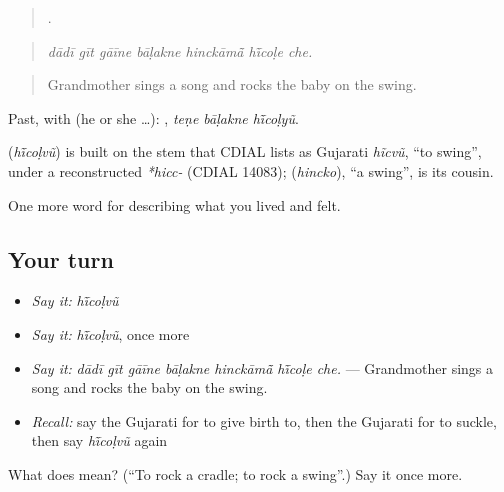 \begin{quote}
      .
\end{quote}

\begin{quote}
\emph{dādī gīt gāīne bāḷakne hinckāmā̃ hī̃coḷe che.}
\end{quote}

\begin{quote}
Grandmother sings a song and rocks the baby on the swing.
\end{quote}

Past, with  (he or she …):   , \emph{teṇe bāḷakne hī̃coḷyũ}.

\begin{cousinweb}
\textbf{} (\emph{hī̃coḷvũ}) is built on the stem that CDIAL lists as Gujarati \emph{hĩcvũ}, \textquotedblleft{}to swing\textquotedblright{}, under a reconstructed \emph{*hicc-} (CDIAL 14083); \textbf{} (\emph{hincko}), \textquotedblleft{}a swing\textquotedblright{}, is its cousin.
\end{cousinweb}

\begin{grammarlens}[title={What you've built}]
One more word for describing what you lived and felt.
\end{grammarlens}

\subsection*{Your turn}
\begin{itemize}
\raggedright
  \item \emph{Say it:} \emph{hī̃coḷvũ}
  \item \emph{Say it:} \emph{hī̃coḷvũ}, once more
  \item \emph{Say it:} \emph{dādī gīt gāīne bāḷakne hinckāmā̃ hī̃coḷe che.} — Grandmother sings a song and rocks the baby on the swing.
  \item \emph{Recall:} say the Gujarati for to give birth to, then the Gujarati for to suckle, then say \emph{hī̃coḷvũ} again
\end{itemize}

\begin{tcolorbox}[breakable,colback=teal!4,colframe=teal!35!black,title={Before you move on}]
What does  mean? (\textquotedblleft{}To rock a cradle; to rock a swing\textquotedblright{}.) Say it once more.
\end{tcolorbox}
